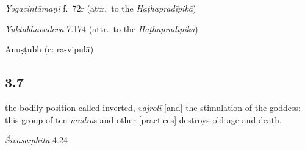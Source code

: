 \begin{ekdosis}
\begin{testimonia}[hp03_006]
\begin{versinnote}
\end{versinnote}

\emph{Yogacintāmaṇi} f.~72r (attr.~to the \emph{Haṭhapradīpikā})
\begin{versinnote}
\end{versinnote}

\emph{Yuktabhavadeva} 7.174 (attr.~to the \emph{Haṭhapradīpikā})
\begin{versinnote}
\end{versinnote}
\end{testimonia}



\begin{metre}[hp03_006]
Anuṣṭubh (c: ra-vipulā)
\end{metre}

\subsection*{3.7}
\begin{translation}[hp03_007]
[\ldots] the bodily position called inverted, \emph{vajrolī} [and] the stimulation of the goddess: this group of ten \emph{mudrā}s and other [practices] destroys old age and death.
\end{translation}


\begin{sources}[hp03_007]
\emph{Śivasaṃhitā} 4.24
\begin{versinnote}
\end{versinnote}
\end{sources}


\end{ekdosis}
